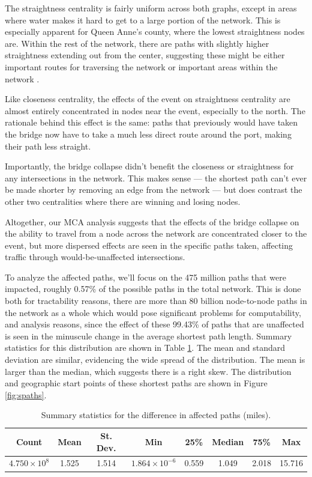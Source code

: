 \documentclass[11pt]{article}
\numberwithin{equation}{section} %
\numberwithin{figure}{section} %
\numberwithin{table}{section} %
\theoremstyle{definition}
\begin{document}
The straightness centrality is fairly uniform across both graphs, except in areas where water makes it hard to get to a large portion of the network. This is especially apparent for Queen Anne's county, where the lowest straightness nodes are. Within the rest of the network, there are paths with slightly higher straightness extending out from the center, suggesting these might be either important routes for traversing the network or important areas within the network \parencites{Porta06}{Wang11}.

Like closeness centrality, the effects of the event on straightness centrality are almost entirely concentrated in nodes near the event, especially to the north. The rationale behind this effect is the same: paths that previously would have taken the bridge now have to take a much less direct route around the port, making their path less straight.

Importantly, the bridge collapse didn't benefit the closeness or straightness for any intersections in the network. This makes sense --- the shortest path can't ever be made shorter by removing an edge from the network --- but does contrast the other two centralities where there are winning and losing nodes.

Altogether, our MCA analysis suggests that the effects of the bridge collapse on the ability to travel from a node across the network are concentrated closer to the event, but more dispersed effects are seen in the specific paths taken, affecting traffic through would-be-unaffected intersections.

To analyze the affected paths, we'll focus on the 475 million paths that were impacted, roughly 0.57\% of the possible paths in the total network. This is done both for tractability reasons, there are more than 80 billion node-to-node paths in the network as a whole which would pose significant problems for computability, and analysis reasons, since the effect of these 99.43\% of paths that are unaffected is seen in the minuscule change in the average shortest path length. Summary statistics for this distribution are shown in Table \ref{tab:spaths}. The mean and standard deviation are similar, evidencing the wide spread of the distribution. The mean is larger than the median, which suggests there is a right skew. The distribution and geographic start points of these shortest paths are shown in Figure \ref{fig:spaths}.

\begin{table}[t!]
  \caption{Summary statistics for the difference in affected paths (miles).}
  \centering
  \begin{tabular}{cccccccc}
    \toprule
    \textbf{Count} & \textbf{Mean}& \textbf{St. Dev.} & \textbf{Min} & \textbf{25\%} & \textbf{Median} & \textbf{75\%} & \textbf{Max} \\
    \midrule
    $4.750 \times 10^8$ & 1.525 & 1.514 & $1.864 \times 10^{-6}$ & 0.559 & 1.049 & 2.018 & 15.716 \\
    \bottomrule
  \end{tabular}
  \label{tab:spaths}
\end{table}
\end{document}
